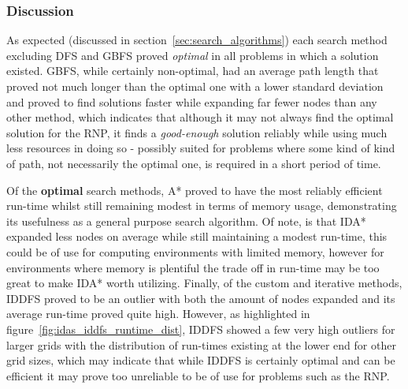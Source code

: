 \subsubsection{Discussion} %
\label{sub:discussion}
As expected (discussed in section~\ref{sec:search_algorithms}) each search method excluding DFS and GBFS proved \textit{optimal} in all problems in which a solution existed. GBFS, while certainly non-optimal, had an average path length that proved not much longer than the optimal one with a lower standard deviation and proved to find solutions faster while expanding far fewer nodes than any other method, which indicates that although it may not always find the optimal solution for the RNP, it finds a \textit{good-enough} solution reliably while using much less resources in doing so - possibly suited for problems where some kind of kind of path, not necessarily the optimal one, is required in a short period of time.
\par
Of the \textbf{optimal} search methods, A* proved to have the most reliably efficient run-time whilst still remaining modest in terms of memory usage, demonstrating its usefulness as a general purpose search algorithm. Of note, is that IDA* expanded less nodes on average while still maintaining a modest run-time, this could be of use for computing environments with limited memory, however for environments where memory is plentiful the trade off in run-time may be too great to make IDA* worth utilizing. Finally, of the custom and iterative methods, IDDFS proved to be an outlier with both the amount of nodes expanded and its average run-time proved quite high. However, as highlighted in figure~\ref{fig:idas_iddfs_runtime_dist}, IDDFS showed a few very high outliers for larger grids with the distribution of run-times existing at the lower end for other grid sizes, which may indicate that while IDDFS is certainly optimal and can be efficient it may prove too unreliable to be of use for problems such as the RNP.


